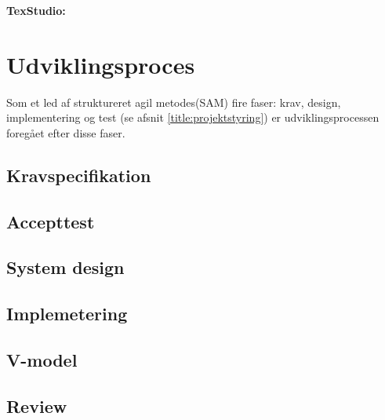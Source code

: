 \textbf{TexStudio:} 


\section{Udviklingsproces} \label{title:udviklingMetode}
Som et led af struktureret agil metodes(SAM) fire faser: krav, design, implementering og test (se afsnit \ref{title:projektstyring}) er udviklingsprocessen foregået efter disse faser. 

	\subsection{Kravspecifikation} \label{title:kravspecifikation}
	
	\subsection{Accepttest} \label{title:accepttest}
	
	\subsection{System design} \label{title:systemdesign}
	
	\subsection{Implemetering} \label{title:implementering}

\subsection{V-model}



\subsection{Review}
